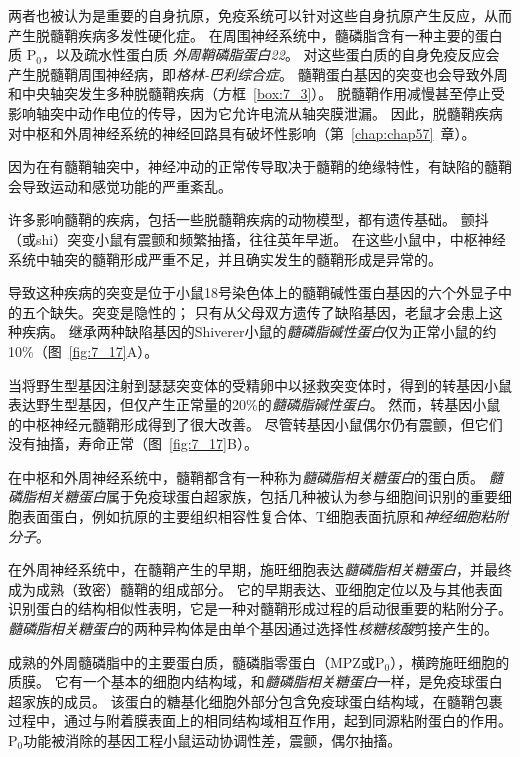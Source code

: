 两者也被认为是重要的自身抗原，免疫系统可以针对这些自身抗原产生反应，从而产生脱髓鞘疾病多发性硬化症。 
在周围神经系统中，髓磷脂含有一种主要的蛋白质 P$_0$，以及疏水性蛋白质 \textit{外周鞘磷脂蛋白22}。
对这些蛋白质的自身免疫反应会产生脱髓鞘周围神经病，即\textit{格林-巴利综合症}。
髓鞘蛋白基因的突变也会导致外周和中央轴突发生多种脱髓鞘疾病（方框~\ref{box:7_3}）。
脱髓鞘作用减慢甚至停止受影响轴突中动作电位的传导，因为它允许电流从轴突膜泄漏。
因此，脱髓鞘疾病对中枢和外周神经系统的神经回路具有破坏性影响（第~\ref{chap:chap57}~章）。


\begin{proposition}[髓鞘蛋白缺陷破坏神经信号传导] \label{box:7_3}
	
	\quad \quad 因为在有髓鞘轴突中，神经冲动的正常传导取决于髓鞘的绝缘特性，有缺陷的髓鞘会导致运动和感觉功能的严重紊乱。
	
	\quad \quad 许多影响髓鞘的疾病，包括一些脱髓鞘疾病的动物模型，都有遗传基础。
	颤抖（或shi）突变小鼠有震颤和频繁抽搐，往往英年早逝。
	在这些小鼠中，中枢神经系统中轴突的髓鞘形成严重不足，并且确实发生的髓鞘形成是异常的。
	
	\quad \quad 导致这种疾病的突变是位于小鼠18号染色体上的髓鞘碱性蛋白基因的六个外显子中的五个缺失。突变是隐性的；
	只有从父母双方遗传了缺陷基因，老鼠才会患上这种疾病。
	继承两种缺陷基因的Shiverer小鼠的\textit{髓磷脂碱性蛋白}仅为正常小鼠的约10\%（图~\ref{fig:7_17}A）。
	
	\quad \quad 当将野生型基因注射到瑟瑟突变体的受精卵中以拯救突变体时，得到的转基因小鼠表达野生型基因，但仅产生正常量的20\%的\textit{髓磷脂碱性蛋白}。
	然而，转基因小鼠的中枢神经元髓鞘形成得到了很大改善。
	尽管转基因小鼠偶尔仍有震颤，但它们没有抽搐，寿命正常（图~\ref{fig:7_17}B）。
	
	\quad \quad 在中枢和外周神经系统中，髓鞘都含有一种称为\textit{髓磷脂相关糖蛋白}的蛋白质。
	\textit{髓磷脂相关糖蛋白}属于免疫球蛋白超家族，包括几种被认为参与细胞间识别的重要细胞表面蛋白，例如抗原的主要组织相容性复合体、T细胞表面抗原和\textit{神经细胞粘附分子}。
	
	\quad \quad 在外周神经系统中，在髓鞘产生的早期，施旺细胞表达\textit{髓磷脂相关糖蛋白}，并最终成为成熟（致密）髓鞘的组成部分。
	它的早期表达、亚细胞定位以及与其他表面识别蛋白的结构相似性表明，它是一种对髓鞘形成过程的启动很重要的粘附分子。
	\textit{髓磷脂相关糖蛋白}的两种异构体是由单个基因通过选择性\textit{核糖核酸}剪接产生的。
	
	\quad 成熟的外周髓磷脂中的主要蛋白质，髓磷脂零蛋白（MPZ或P$_0$），横跨施旺细胞的质膜。
	它有一个基本的细胞内结构域，和\textit{髓磷脂相关糖蛋白}一样，是免疫球蛋白超家族的成员。
	该蛋白的糖基化细胞外部分包含免疫球蛋白结构域，在髓鞘包裹过程中，通过与附着膜表面上的相同结构域相互作用，起到同源粘附蛋白的作用。
	P$_0$功能被消除的基因工程小鼠运动协调性差，震颤，偶尔抽搐。
	

\end{proposition}
